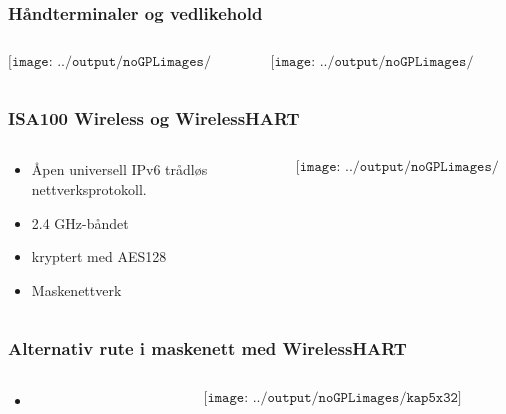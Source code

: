\documentclass[aspectratio=169,xcolor=dvipsnames]{beamer}
\begin{document}
\begin{frame}
	\frametitle{Håndterminaler og vedlikehold}
	\begin{columns}
		\begin{column}{0.5\textwidth}

	$$\texttt{[image: ../output/noGPLimages/kap5x30]}$$

			
		\end{column}

		\begin{column}{0.5\textwidth}
	$$\texttt{[image: ../output/noGPLimages/kap5x29]}$$
		\end{column}
	\end{columns}
\end{frame}
\begin{frame}
	\frametitle{ISA100 Wireless og WirelessHART}
	\begin{columns}
		\begin{column}{0.5\textwidth}

			\begin{itemize}
				\item Åpen universell IPv6 trådløs nettverksprotokoll.
				\item 2.4 GHz-båndet
				\item kryptert med AES128
				\item Maskenettverk
			\end{itemize}

			
		\end{column}

		\begin{column}{0.5\textwidth}
	$$\texttt{[image: ../output/noGPLimages/kap5x31]}$$
		\end{column}
	\end{columns}
\end{frame}
\begin{frame}
	\frametitle{Alternativ rute i maskenett med WirelessHART}
	\begin{columns}
		\begin{column}{0.5\textwidth}

			\begin{itemize}
				\item      
			\end{itemize}

			
		\end{column}

		\begin{column}{0.5\textwidth}
	$$\texttt{[image: ../output/noGPLimages/kap5x32]}$$
		\end{column}
	\end{columns}
\end{frame}
\end{document}
